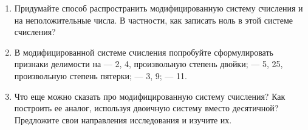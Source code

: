 \begin{enumerate}
\item Придумайте способ распространить модифицированную систему счисления и на неположительные числа. В частности, как записать ноль в этой системе счисления?

\item В модифицированной системе счисления попробуйте сформулировать признаки делимости на
\subitem — 2, 4, произвольную степень двойки;
\subitem — 5, 25, произвольную степень пятерки;
\subitem — 3, 9;
\subitem — 11.

\item Что еще можно сказать про модифицированную систему счисления? Как построить ее аналог, используя двоичную систему вместо десятичной? Предложите свои направления исследования и изучите их.
\end{enumerate}